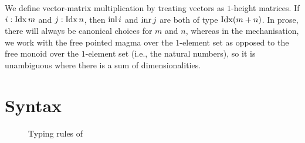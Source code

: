 \documentclass[submission,copyright,creativecommons]{eptcs}
\begin{document}
We define vector-matrix multiplication by treating vectors
as $1$-height matrices.
If $i : \operatorname{Idx} m$ and $j : \operatorname{Idx} n$, then $\operatorname{inl} i$ and $\operatorname{inr} j$ are both of type
$\operatorname{Idx}(m + n)$.
In prose, there will always be canonical choices for $m$ and $n$, whereas in the
mechanisation, we work with the free pointed magma over the $1$-element set as
opposed to the free monoid over the $1$-element set (i.e., the natural numbers),
so it is unambiguous where there is a sum of dimensionalities.

\section{Syntax}\label{sec:syntax}

\begin{figure}[t]
  \caption{Typing rules of \name{}}
  \label{fig:rules}
\end{figure}
\end{document}
